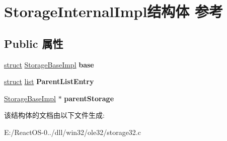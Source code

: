 \hypertarget{struct_storage_internal_impl}{}\section{Storage\+Internal\+Impl结构体 参考}
\label{struct_storage_internal_impl}
\subsection*{Public 属性}
\begin{DoxyCompactItemize}
\item 
\mbox{\label{struct_storage_internal_impl_a679a271ef50c948cda9125e79721bea8}} 
\hyperlink{interfacestruct}{struct} \hyperlink{struct_storage_base_impl}{Storage\+Base\+Impl} {\bfseries base}
\item 
\mbox{\label{struct_storage_internal_impl_a77af39e013dd8ba250894df69f8fcf4b}} 
\hyperlink{interfacestruct}{struct} \hyperlink{classlist}{list} {\bfseries Parent\+List\+Entry}
\item 
\mbox{\label{struct_storage_internal_impl_a2434ae857cdb592d354b5e831ebcb042}} 
\hyperlink{struct_storage_base_impl}{Storage\+Base\+Impl} $\ast$ {\bfseries parent\+Storage}
\end{DoxyCompactItemize}


该结构体的文档由以下文件生成\+:\begin{DoxyCompactItemize}
\item 
E\+:/\+React\+O\+S-\/0../dll/win32/ole32/storage32.\+c\end{DoxyCompactItemize}
